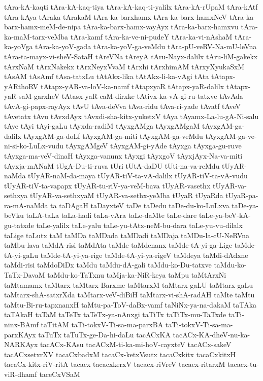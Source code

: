 {tAra-kA-kaqti
tAra-kA-kaq-tiya
tAra-kA-kaq-ti-yalilx
tAra-kA-rUpaM
tAra-kAtf
tAra-kAya
tAraka
tArakaM
tAra-ka-barxhamx
tAra-ka-barx-hamxNeV
tAra-ka-barx-hamx-meM-de-nipa
tAra-ka-barx-hamx-vayAyx
tAra-ka-barx-hamxvu
tAra-ka-maM-tarx-veMba
tAra-kamf
tAra-ka-ve-ni-pudeY
tAra-ka-vi-nAshaM
tAra-ka-yoVga
tAra-ka-yoV-gada
tAra-ka-yoV-ga-veMdu
tAra-pU-veRV-Na-mU-leVna
tAra-ta-mayx-vi-sheV-SataH
tAreVNa
tAreyA
tAru-Nayx-dalilx
tAru-liM-gakekx
tArxNaM
tArxNakekx
tArxNeyxVvaM
tArxhi
tArxhimAM
tArxyXyukaSxM
tAsAM
tAsAmf
tAsa-tatxLu
tAtAkx-lika
tAtAkx-li-ka-vAgi
tAta
tAtapx-yARthoRV
tAtapx-yAR-va-loV-ka-namf
tAtapxyaR
tAtapx-yaR-dalilx
tAtapx-yaR-saM-garxheV
tAtasx-yaR-caM-dirxke
tAtivx-ka-vA-gi-ru-tatxve
tAvAda
tAvA-gi-papx-rayAyx
tAvU
tAva-deVva
tAva-ridu
tAva-ri-yade
tAvatf
tAveV
tAvetatx
tAvu
tAvxdAyx
tAvxdi-sha-kitx-yuketxV
tAya
tAyamx-La-lu-gA-Ni-salu
tAye
tAyi
tAyi-gaLu
tAyxda-radiM
tAyxgAMga
tAyxgAMgaM
tAyxgAM-ga-dalilx
tAyxgAM-ga-doLf
tAyxgAM-ga-miti
tAyxgAM-ga-veMdu
tAyxgAM-ga-ve-ni-si-ko-LuLx-vudu
tAyxgAMgeV
tAyxgAM-gi-yAde
tAyxga
tAyxga-gu-ruve
tAyxga-ma-veV-dinaH
tAyxga-vanunx
tAyxgi
tAyxgoV
tAyxjAyx-Na-va-miti
tAyxja-mANaM
tUgA-Du-ti-ruva
tUri
tUtA-daDU
tUti-na-va-reMdu
tUyAR-naMda
tUyAR-naM-da-maya
tUyAR-tiV-ta-vA-dalilx
tUyAR-tiV-ta-vA-vudu
tUyAR-tiV-ta-vapapx
tUyAR-tu-riV-ya-veM-bava
tUyAR-vasethx
tUyAR-va-sethxya
tUyAR-va-sethxyaM
tUyAR-va-sethx-yeMba
tUyaR
tUyaRda
tUyaR-pa-ra-mA-naMda
ta
taDAgaH
taDayxteV
taDe
taDedu
taDe-du-ko-LuLxva
taDe-ya-beVku
taLA-taLa
taLa-hadi
taLa-vAra
taLe-daMte
taLe-dare
taLe-ya-beV-kA-gu-tatxde
taLe-yalilx
taLe-yalu
taLe-yu-tAtx-neM-bu-dara
taLe-yu-vu-dilalx
taLige
taLutx
taM
taMDa
taMDada
taMDadi
taMDaja
taMDu-la-cU-NeRVna
taMbu-lava
taMdA-risi
taMdAta
taMde
taMdenanx
taMde-tA-yi-ga-Lige
taMde-tA-yi-gaLu
taMde-tA-yi-ya-rige
taMde-tA-yi-ya-rigeV
taMdeya
taMdi-dAdxne
taMdi-risi
taMdoDiDx
taMdu
taMdu-dA-gali
taMdu-ko-Du-tatxve
taMdu-ko-TaTx-DavaM
taMdu-ko-TaTxnu
taMja-ka-NiR-keya
taMpu
taMtArxNi
taMtamamx
taMtarx
taMtarx-Barxme
taMtarxM
taMtarx-gaLU
taMtarx-gaLu
taMtarx-shA-satxrXda
taMtarx-veV-diBiH
taMtarx-vi-shA-radAH
taMte
taMtu
taMtu-Bi-ru-tapxnanxH
taMtu-pa-ToV-daBx-vamf
taNiNx-ya-na-dakaM
taTAka
taTAkaH
taTaM
taTeTx
taTeTx-ya-nAnxgi
taTiTx
taTiTx-mu-TaTxde
taTi-ninx-BAmf
taTitAM
taTi-tokxV-Ti-sa-ma-parxBA
taTi-tokxV-Ti-sa-ma-parxKAyx
taTuTx
taTuTx-ge-Da-hi-daLu
tacACxKA
tacACx-KA-dheV-nu-ka-NARKAyx
tacACx-KAsu
tacACxM-ti-ka-mi-hoV-cayxteV
tacACx-sakeV
tacACxsetxrXV
tacaCxbadxM
tacaCx-ketxVsutx
tacaCxkitx
tacaCxkitxH
tacaCx-kitx-riV-ritA
tacacx
tacacxkerxV
tacacx-riVreV
tacacx-ritarxM
tacacx-tu-viR-dhamf
taceCxVSaM
}
